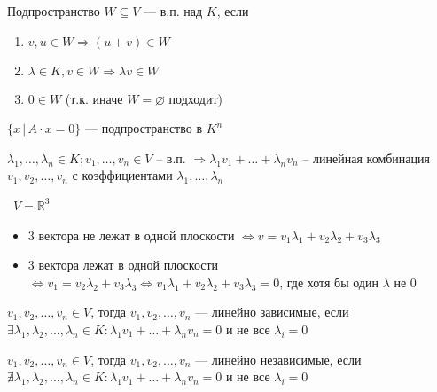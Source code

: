 \begin{definition}
    Подпространство $W \subseteq V$ --- в.п. над $K$, если
    \begin{enumerate}
        \item $v, u \in W \Longrightarrow (u + v) \in W$
        \item $\lambda \in K, v \in W \Longrightarrow \lambda v \in W$
        \item $0 \in W$ (т.к. иначе $W = \varnothing$ подходит)
    \end{enumerate}
\end{definition}

\quad

\begin{example}
    $\{ x \,| \, A \cdot x = 0 \} $ --- подпространство в $K ^ n$
\end{example}



\begin{definition}
    $\lambda_1, \dots, \lambda_n \in K; v_1, \dots, v_n \in V $ -- в.п. $\Longrightarrow \lambda_1 v_1 + \dots + \lambda_n v_n$ -- линейная комбинация $v_1, v_2, \dots, v_n$ с коэффициентами $\lambda_1, \dots, \lambda_n$ 
\end{definition}

\begin{motivation} 

    \quad\, $V = \mathbb{R} ^ 3$
    \begin{itemize}
        \item 3 вектора не лежат в одной плоскости $\Longleftrightarrow v = v_1\lambda_1 + v_2\lambda_2 + v_3\lambda_3$ 
        \item 3 вектора лежат в одной плоскости $\Longleftrightarrow v_1 = v_2\lambda_2 + v_3\lambda_3 \Longleftrightarrow v_1\lambda_1 + v_2\lambda_2 + v_3\lambda_3 = 0$, где хотя бы один $\lambda$ не 0 
    \end{itemize} 
    
\end{motivation}


\begin{definition}
    $v_1, v_2, \dots, v_n \in V$, тогда $v_1, v_2, \dots, v_n$ --- линейно зависимые, если \\ $\exists \lambda_1, \lambda_2, \dots, \lambda_n \in K : \lambda_1 v_1 + \dots + \lambda_n v_n = 0$ и не все $\lambda_i = 0$
\end{definition}

\begin{definition}
    $v_1, v_2, \dots, v_n \in V$, тогда $v_1, v_2, \dots, v_n$ --- линейно независимые, если \\ $\nexists \lambda_1, \lambda_2, \dots, \lambda_n \in K : \lambda_1 v_1 + \dots + \lambda_n v_n = 0$ и не все $\lambda_i = 0$
\end{definition}
